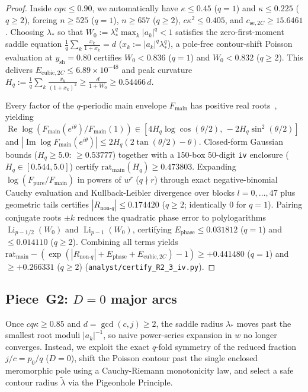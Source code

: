 \documentclass[10pt]{article}
\numberwithin{equation}{section}
\theoremstyle{plain}
\theoremstyle{definition}
\newcommand{\1}{\mathbf{1}}
\DeclareMathOperator{\Li}{Li}
\DeclareMathOperator{\re}{Re}
\DeclareMathOperator{\im}{Im}
\newcommand{\code}[1]{\texttt{#1}}
\begin{document}
\begin{proof}
Inside $c q \kappa \le 0.90$, we automatically have $\kappa \le 0.45$ ($q = 1$) and $\kappa \le 0.225$ ($q \ge 2$), forcing $n \ge 525$ ($q = 1$), $n \ge 657$ ($q \ge 2$), $c\kappa^2 \le 0.405$, and $c_{\mathrm{se},2C} \ge 15.6461$. Choosing $\lambda_*$ so that $W_0 := \lambda_*^q \max_k |a_k|^q < 1$ satisfies the zero-first-moment saddle equation $\frac{1}{q}\sum_k \frac{x_k}{1 + x_k} = d$ ($x_k := |a_k|^q \lambda_*^q$), a pole-free contour-shift Poisson evaluation at $y_{\mathrm{sh}} = 0.80$ certifies $W_0 < 0.836$ ($q = 1$) and $W_0 < 0.832$ ($q \ge 2$). This delivers $E_{\mathrm{cubic},2C} \le 6.89 \times 10^{-48}$ and peak curvature $H_q := \frac{1}{q}\sum_k \frac{x_k}{(1+x_k)^2} \ge \frac{d}{1 + W_0} \ge 0.54466\, d$.

Every factor of the $q$-periodic main envelope $F_{\mathrm{main}}$ has positive real roots~\cite{PolyaSzego1976}, yielding $\re\log(F_{\mathrm{main}}(e^{i\theta})/F_{\mathrm{main}}(1)) \in [4 H_q \log\cos(\theta/2),\, -2 H_q \sin^2(\theta/2)]$ and $|\im\log F_{\mathrm{main}}(e^{i\theta})| \le 2 H_q(2\tan(\theta/2) - \theta)$. Closed-form Gaussian bounds ($H_q \ge 5.0$: $\ge 0.53777$) together with a $150$-box $50$-digit \code{iv} enclosure ($H_q \in [0.544, 5.0]$) certify $\mathrm{rat}_{\mathrm{main}}(H_q) \ge 0.473803$. Expanding $\log(F_{\mathrm{pure}}/F_{\mathrm{main}})$ in powers of $w^r$ ($q \nmid r$) through exact negative-binomial Cauchy evaluation and Kullback-Leibler divergence over blocks $l = 0, \dots, 47$ plus geometric tails certifies $|R_{\mathrm{non}\text{-}q}| \le 0.174420$ ($q \ge 2$; identically $0$ for $q = 1$). Pairing conjugate roots $\pm k$ reduces the quadratic phase error to polylogarithms $\Li_{p-1/2}(W_0)$ and $\Li_{p-1}(W_0)$, certifying $E_{\mathrm{phase}} \le 0.031812$ ($q = 1$) and $\le 0.014110$ ($q \ge 2$). Combining all terms yields $\mathrm{rat}_{\mathrm{main}} - (\exp(|R_{\mathrm{non}\text{-}q}| + E_{\mathrm{phase}} + E_{\mathrm{cubic},2C}) - 1) \ge +0.441480$ ($q = 1$) and $\ge +0.266331$ ($q \ge 2$) (\code{analyst/certify\_R2\_3\_iv.py}).
\end{proof}

\subsection{Piece~G2: \texorpdfstring{$D = 0$}{D = 0} major arcs}
\label{sec:G2}

Once $c q \kappa \ge 0.85$ and $d = \gcd(c, j) \ge 2$, the saddle radius $\lambda_*$ moves past the smallest root moduli $|a_k|^{-1}$, so naive power-series expansion in $w$ no longer converges. Instead, we exploit the exact $q$-fold symmetry of the reduced fraction $j/c = p_0/q$ ($D = 0$), shift the Poisson contour past the single enclosed meromorphic pole using a Cauchy-Riemann monotonicity law, and select a safe contour radius $\tilde{\lambda}$ via the Pigeonhole Principle.
\end{document}
